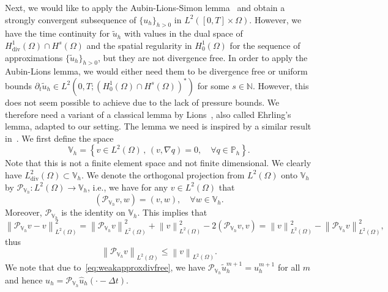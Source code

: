 \documentclass[10pt,letterpaper]{amsart}
\newcommand{\N}{\mathbb{N}}
\newcommand{\tu}{\widetilde{u}}
\newcommand{\hu}{\widehat{u}}
\newcommand\norm[1]{\left\lVert#1\right\rVert}
\newcommand{\Grad}{\nabla}
\newcommand{\Div}{\operatorname{div}}
\newcommand{\dom}{\Omega}
\newcommand{\Vh}{\mathbb{V}_h}
\newcommand{\Ph}{\mathbb{P}_h}
\newcommand{\PVh}{\mathcal{P}_{\Vh}}
\theoremstyle{definition}{\newtheorem{definition}[lemma]{Definition}}
\numberwithin{equation}{section}
\begin{document}
Next, we would like to apply the Aubin-Lions-Simon lemma~\cite{Simon1987} and obtain a strongly convergent subsequence of $\{u_h\}_{h>0}$ in $L^2([0,T]\times\dom)$. However,   we have the time continuity for $\tu_h$ with values in the dual space of $H^1_{\Div}(\dom)\cap H^s(\dom)$ and the spatial regularity in $H^1_0(\dom)$ for the sequence of approximations $\{\tu_h\}_{h>0}$, but they are not divergence free. In order to apply the Aubin-Lions lemma, we would either need them to be divergence free or uniform bounds $\partial_t \tu_h \in L^2(0,T;(H^1_0(\dom)\cap H^s(\dom))^*)$ for some $s\in \N$. However, this does not seem possible to achieve due to the lack of pressure bounds.
We therefore need a variant of a classical lemma by Lions~\cite[Ch.III, Lem. 2.1]{Temam1977}, also called Ehrling's lemma, adapted to our setting. 
The lemma we need is inspired by a similar result in~\cite{Eymard2024}. We first define the space
\begin{equation}
	\label{eq:spaceV}
	\Vh = \left\{v\in L^2(\dom)\, ,\, (v,\Grad q) = 0,\quad \forall q\in \Ph \right\}.
\end{equation}
Note that this is not a finite element space and not finite dimensional. We clearly have $L^2_{\Div}(\dom)\subset \Vh$. We denote the orthogonal projection from $L^2(\dom)$ onto $\Vh$ by $\PVh:L^2(\dom)\to \Vh$, i.e., we have for any $v \in L^2(\dom)$ that
\begin{equation*}
	(\PVh v,w) = (v,w),\quad \forall w\in \Vh.
\end{equation*}
Moreover, $\PVh$ is the identity on $\Vh$.
This implies that
\begin{equation*}
	\norm{\PVh v - v}_{L^2(\dom)}^2 = \norm{\PVh v }_{L^2(\dom)}^2 + \norm{v}_{L^2(\dom)}^2 - 2(\PVh v,v) = \norm{v}_{L^2(\dom)}^2 -  \norm{\PVh v }_{L^2(\dom)}^2,
\end{equation*}
thus
\begin{equation*}
	\norm{\PVh v}_{L^2(\dom)}\leq \norm{v}_{L^2(\dom)}. 
\end{equation*}
We note that due to~\eqref{eq:weakapproxdivfree}, we have $\PVh \tu^{m+1}_h = u^{m+1}_h$ for all $m$ and hence $u_h = \PVh \hu_h(\cdot -\Delta t)$.%
\end{document}
